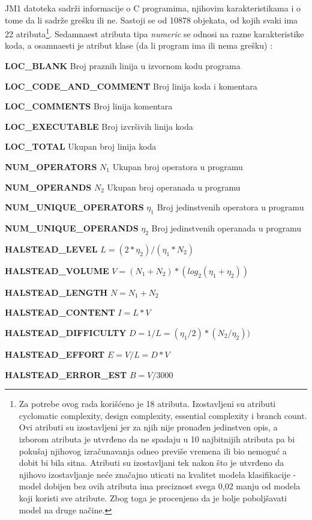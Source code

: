 \documentclass[12pt,oneside]{memoir}
\begin{document}
JM1 datoteka sadrži informacije o C programima, njihovim karakteristikama i o tome da li sadrže grešku ili ne. Sastoji se od 10878 objekata, od kojih svaki ima 22 atributa\footnote{Za potrebe ovog rada korišćeno je 18 atributa.  Izostavljeni su atributi cyclomatic complexity, design complexity, essential complexity i branch count. Ovi atributi su izostavljeni jer za njih nije pronađen jedinstven opis, a izborom atributa je utvrđeno da ne spadaju u 10 najbitnijih atributa pa bi pokušaj njihovog izračunavanja odneo previše vremena ili bio nemoguć a dobit bi bila sitna. Atributi su izostavljani tek nakon što je utvrđeno da njihovo izostavljanje neće značajno uticati na kvalitet modela klasifikacije - model dobijen bez ovih atributa ima preciznost svega 0,02 manju od modela koji koristi sve atribute. Zbog toga je procenjeno da je bolje poboljšavati model na druge načine. }. Sedamnaest atributa tipa \textit{numeric} se odnosi na razne karakteristike koda, a osamnaesti je atribut klase (da li program ima ili nema grešku) \cite{jm1}: 

\textbf{LOC\_BLANK} Broj praznih linija u izvornom kodu programa

\textbf{LOC\_CODE\_AND\_COMMENT} Broj linija koda i komentara

\textbf{LOC\_COMMENTS} Broj linija komentara

\textbf{LOC\_EXECUTABLE} Broj izvršivih linija koda

\textbf{LOC\_TOTAL} Ukupan broj linija koda

\textbf{NUM\_OPERATORS} $N_1$ Ukupan broj operatora u programu

\textbf{NUM\_OPERANDS} $N_2$ Ukupan broj operanada u programu

\textbf{NUM\_UNIQUE\_OPERATORS} $\eta_1$ Broj jedinstvenih operatora u programu

\textbf{NUM\_UNIQUE\_OPERANDS} $\eta_2$ Broj jedinstvenih operanada u programu

\textbf{HALSTEAD\_LEVEL} $L = (2*\eta_2)/(\eta_1*N_2)$

\textbf{HALSTEAD\_VOLUME} $V = (N_1+N_2)*(log_2(\eta_1+\eta_2))$ %

\textbf{HALSTEAD\_LENGTH} $N = N_1+N_2$

\textbf{HALSTEAD\_CONTENT} $I = L*V$

\textbf{HALSTEAD\_DIFFICULTY} $D = 1/L = (\eta_1/2)*(N_2/\eta_2))$

\textbf{HALSTEAD\_EFFORT} $E = V/L = D*V$

\textbf{HALSTEAD\_ERROR\_EST} $B = V/3000$
\end{document}
